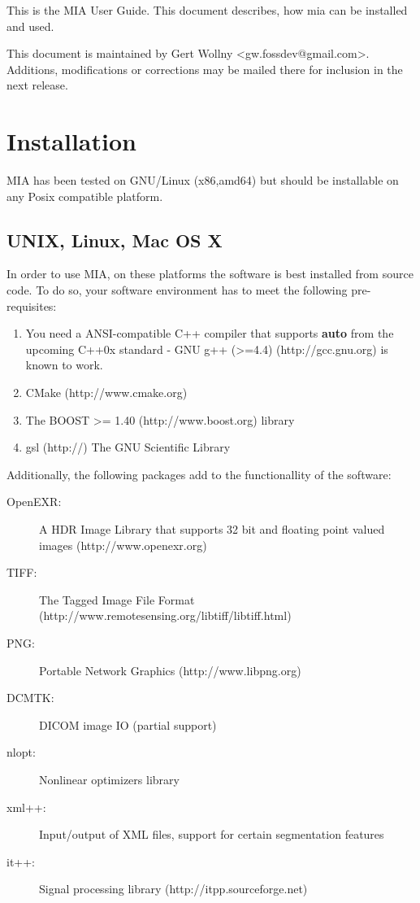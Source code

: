 \documentclass[english, 10pt, a4paper,headsepline,openany]{scrbook}
\begin{document}
This is the MIA User Guide. This document describes, how mia can be installed and used. 

This document is maintained by Gert Wollny <gw.fossdev@gmail.com>. 
Additions, modifications or corrections may be mailed there for inclusion in the next release. 

\section{Installation}

MIA has been tested on GNU/Linux (x86,amd64) but should be installable on any Posix compatible platform. 


\subsection{UNIX, Linux, Mac OS X} 

In order to use MIA, on these platforms the software is best installed from source code. 
To do so, your software environment has to meet the following pre-requisites: 

\begin{enumerate}
\item You need a ANSI-compatible C++ compiler that supports {\bf auto} from the upcoming 
   C++0x standard - GNU g++ (>=4.4) (http://gcc.gnu.org) is known to work. 
\item CMake (http://www.cmake.org) 
\item The BOOST >= 1.40 (http://www.boost.org) library
\item gsl (http://) The GNU Scientific Library 
\end{enumerate}

Additionally, the following packages add to the functionallity of the software: 

\begin{description}
\item [OpenEXR:] A HDR Image Library that supports 32 bit and floating point valued images (http://www.openexr.org)
\item [TIFF:]    The Tagged Image File Format (http://www.remotesensing.org/libtiff/libtiff.html)
\item [PNG:]     Portable Network Graphics (http://www.libpng.org)
\item [DCMTK:]   DICOM image IO (partial support) 
\item [nlopt:]   Nonlinear optimizers library 
\item [xml++:]   Input/output of XML files, support for certain segmentation features
\item [it++:]    Signal processing library (http://itpp.sourceforge.net) 
\end{description}
\end{document}
